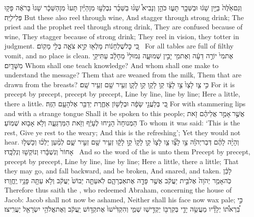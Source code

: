 {וְגַם\maqqaf אֵ֙לֶּה֙ בַּיַּ֣יִן שָׁג֔וּ וּבַשֵּׁכָ֖ר תָּע֑וּ כֹּהֵ֣ן וְנָבִיא֩ שָׁג֨וּ בַשֵּׁכָ֜ר נִבְלְע֣וּ מִן\maqqaf הַיַּ֗יִן תָּעוּ֙ מִן\maqqaf הַשֵּׁכָ֔ר שָׁגוּ֙ בָּרֹאֶ֔ה פָּק֖וּ פְּלִילִיָּֽה׃}
{But these also reel through wine, And stagger through strong drink; The priest and the prophet reel through strong drink, They are confused because of wine, They stagger because of strong drink; They reel in vision, they totter in judgment.}
{כִּ֚י כׇּל\maqqaf שֻׁלְחָנ֔וֹת מָלְא֖וּ קִ֣יא צֹאָ֑ה בְּלִ֖י מָקֽוֹם׃ \petucha }
{For all tables are full of filthy vomit, and no place is clean.}
{אֶת\maqqaf מִי֙ יוֹרֶ֣ה דֵעָ֔ה וְאֶת\maqqaf מִ֖י יָבִ֣ין שְׁמוּעָ֑ה גְּמוּלֵי֙ מֵחָלָ֔ב עַתִּיקֵ֖י מִשָּׁדָֽיִם׃}
{Whom shall one teach knowledge? And whom shall one make to understand the message? Them that are weaned from the milk, Them that are drawn from the breasts?}
{כִּ֣י צַ֤ו לָצָו֙ צַ֣ו לָצָ֔ו קַ֥ו לָקָ֖ו קַ֣ו לָקָ֑ו זְעֵ֥יר שָׁ֖ם זְעֵ֥יר שָֽׁם׃}
{For it is precept by precept, precept by precept, Line by line, line by line; Here a little, there a little.}
{כִּ֚י בְּלַעֲגֵ֣י שָׂפָ֔ה וּבְלָשׁ֖וֹן אַחֶ֑רֶת יְדַבֵּ֖ר אֶל\maqqaf הָעָ֥ם הַזֶּֽה׃}
{For with stammering lips and with a strange tongue Shall it be spoken to this people;}
{אֲשֶׁ֣ר \legarmeh  אָמַ֣ר אֲלֵיהֶ֗ם זֹ֤את הַמְּנוּחָה֙ הָנִ֣יחוּ לֶעָיֵ֔ף וְזֹ֖את הַמַּרְגֵּעָ֑ה וְלֹ֥א אָב֖וּא שְׁמֽוֹעַ׃}
{To whom it was said: ‘This is the rest, Give ye rest to the weary; And this is the refreshing’; Yet they would not hear.}
{וְהָיָ֨ה לָהֶ֜ם דְּבַר\maqqaf יְהֹוָ֗ה צַ֣ו לָצָ֞ו צַ֤ו לָצָו֙ קַ֤ו לָקָו֙ קַ֣ו לָקָ֔ו זְעֵ֥יר שָׁ֖ם זְעֵ֣יר שָׁ֑ם לְמַ֨עַן יֵלְכ֜וּ וְכָשְׁל֤וּ אָחוֹר֙ וְנִשְׁבָּ֔רוּ וְנוֹקְשׁ֖וּ וְנִלְכָּֽדוּ׃ \petucha }
{And so the word of the \lord\space is unto them Precept by precept, precept by precept, Line by line, line by line; Here a little, there a little; That they may go, and fall backward, and be broken, And snared, and taken.}
\newperek
\setcounter{chap}{29}
\setcounter{verse}{22}
{לָכֵ֗ן כֹּֽה\maqqaf אָמַ֤ר יְהֹוָה֙ אֶל\maqqaf בֵּ֣ית יַעֲקֹ֔ב אֲשֶׁ֥ר פָּדָ֖ה אֶת\maqqaf אַבְרָהָ֑ם לֹֽא\maqqaf עַתָּ֤ה יֵבוֹשׁ֙ יַעֲקֹ֔ב וְלֹ֥א עַתָּ֖ה פָּנָ֥יו יֶֽחֱוָֽרוּ׃}
{Therefore thus saith the \lord, who redeemed Abraham, concerning the house of Jacob: Jacob shall not now be ashamed, Neither shall his face now wax pale;}
{כִּ֣י בִ֠רְאֹת֠וֹ יְלָדָ֞יו מַעֲשֵׂ֥ה יָדַ֛י בְּקִרְבּ֖וֹ יַקְדִּ֣ישֽׁוּ שְׁמִ֑י וְהִקְדִּ֙ישׁוּ֙ אֶת\maqqaf קְד֣וֹשׁ יַֽעֲקֹ֔ב וְאֶת\maqqaf אֱלֹהֵ֥י יִשְׂרָאֵ֖ל יַעֲרִֽיצוּ׃}
